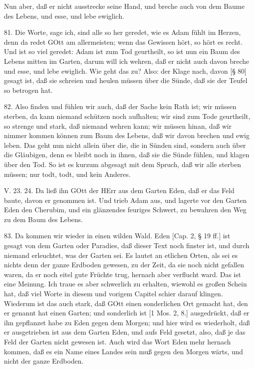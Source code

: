 Nun aber, daß er nicht ausstrecke seine Hand, und breche auch von dem Baume des Lebens, und esse, und lebe ewiglich.

81. Die Worte, sage ich, sind alle so her geredet, wie es Adam fühlt im Herzen, denn da redet GOtt am allermeisten; wenn das Gewissen hört, so hört es recht. Und ist so viel geredet: Adam ist zum Tod geurtheilt, so ist nun ein Baum des Lebens mitten im Garten, darum will ich wehren, daß er nicht auch davon breche und esse, und lebe ewiglich. Wie geht das zu? Also: der Klage nach, davon [§ 80] gesagt ist, daß sie schreien und heulen müssen über die Sünde, daß sie der Teufel so betrogen hat.

82. Also finden und fühlen wir auch, daß der Sache kein Rath ist; wir müssen sterben, da kann niemand schützen noch aufhalten; wir sind zum Tode geurtheilt, so strenge und stark, daß niemand wehren kann; wir müssen hinan, daß wir nimmer kommen können zum Baum des Lebens, daß wir davon brechen und ewig leben. Das geht nun nicht allein über die, die in Sünden sind, sondern auch über die Gläubigen, denn es bleibt noch in ihnen, daß sie die Sünde fühlen, und klagen über den Tod. So ist es kurzum abgesagt mit dem Spruch, daß wir alle sterben müssen; nur todt, todt, und kein Anderes.

\begin{schriftzitat}
V. 23. 24. Da ließ ihn GOtt der HErr aus dem Garten Eden, daß er das Feld baute, davon er genommen ist. Und trieb Adam aus, und lagerte vor den Garten Eden den Cherubim, und ein glänzendes feuriges Schwert, zu bewahren den Weg zu dem Baum des Lebens.
\end{schriftzitat}

83. Da kommen wir wieder in einen wilden Wald. Eden [Cap. 2, § 19 ff.] ist gesagt von dem Garten oder Paradies, daß dieser Text noch finster ist, und durch niemand erleuchtet, was der Garten sei. Es lautet an etlichen Orten, als sei es nichts denn der ganze Erdboden gewesen, zu der Zeit, da sie noch nicht gefallen waren, da er noch eitel gute Früchte trug, hernach aber verflucht ward. Das ist eine Meinung. Ich traue es aber schwerlich zu erhalten, wiewohl es großen Schein hat, daß viel Worte in diesem und vorigem Capitel schier darauf klingen. Wiederum ist das auch stark, daß GOtt einen sonderlichen Ort gemacht hat, den er genannt hat einen Garten; und sonderlich ist [1 Mos. 2, 8.] ausgedrückt, daß er ihn gepflanzet habe zu Eden gegen dem Morgen; und hier wird es wiederholt, daß er ausgetrieben ist aus dem Garten Eden, und aufs Feld gesetzt, also, daß je das Feld der Garten nicht gewesen ist. Auch wird das Wort Eden mehr hernach kommen, daß es ein Name eines Landes sein muß gegen den Morgen wärts, und nicht der ganze Erdboden.

